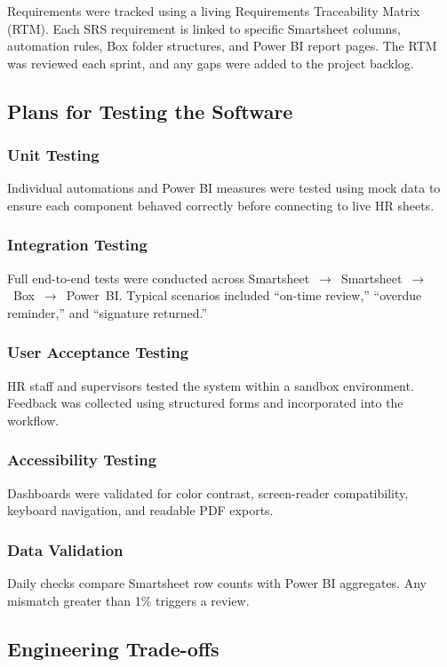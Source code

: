 \documentclass[12pt]{article}
\begin{document}
Requirements were tracked using a living Requirements Traceability Matrix (RTM). Each SRS
requirement is linked to specific Smartsheet columns, automation rules,
Box folder structures, and Power BI report pages. The RTM was reviewed each sprint, and any
gaps were added to the project backlog.

\subsection{Plans for Testing the Software}

\subsubsection{Unit Testing}
Individual automations and Power BI measures were tested using mock
data to ensure each component behaved correctly before connecting to live HR sheets.

\subsubsection{Integration Testing}
Full end-to-end tests were conducted across Smartsheet~$\rightarrow$~Smartsheet~$\rightarrow$~Box~$\rightarrow$~Power~BI.
Typical scenarios included “on-time review,” “overdue reminder,” and “signature returned.”

\subsubsection{User Acceptance Testing}
HR staff and supervisors tested the system within a sandbox environment. Feedback was
collected using structured forms and incorporated into the workflow.

\subsubsection{Accessibility Testing}
Dashboards were validated for color contrast, screen-reader compatibility, keyboard navigation,
and readable PDF exports.

\subsubsection{Data Validation}
Daily checks compare Smartsheet row counts with Power BI aggregates. Any mismatch greater
than 1\% triggers a review.

\subsection{Engineering Trade-offs}
\end{document}
